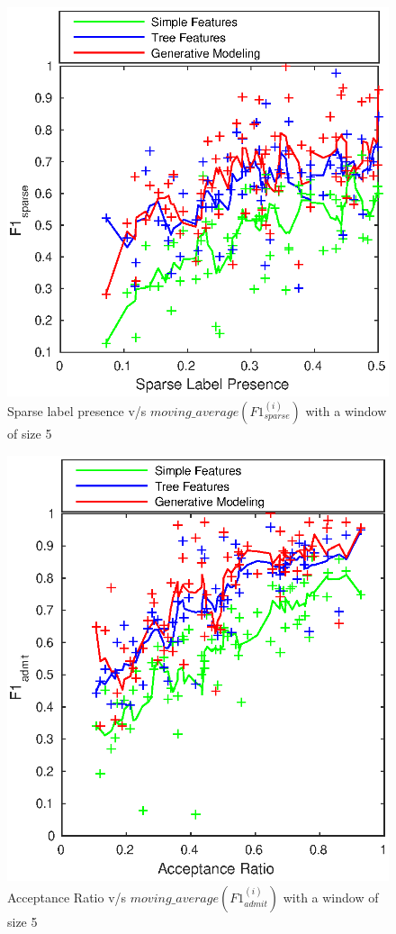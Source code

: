 \documentclass{sig-alternate-05-2015}
\begin{document}
\begin{figure}[t]
\centering
\includegraphics[scale=0.8]{sparse_label_vs_simple_tree_em.eps}
\caption{Sparse label presence v/s $moving\_average(F1^{(i)}_{sparse})$ with a window of size 5}
\label{fig:sparse_simple_tree_em}
\end{figure}

\begin{figure}[t]
\centering
\includegraphics[scale=0.8]{acceptance_ratio_vs_simple_tree_em.eps}
\caption{Acceptance Ratio v/s $moving\_average(F1^{(i)}_{admit})$ with a window of size 5}
\label{fig:acceptance_simple_tree_em}
\end{figure}
\end{document}
